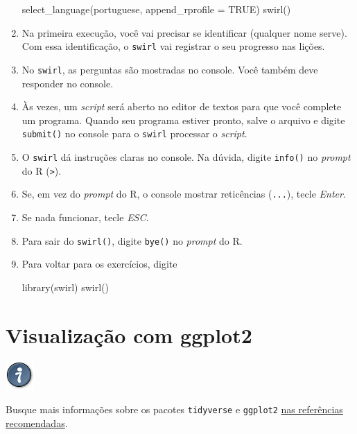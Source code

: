 \documentclass[
  11pt]{report}
\newenvironment{Shaded}{\begin{snugshade}}{\end{snugshade}}
\newcommand{\AttributeTok}[1]{\textcolor[rgb]{0.77,0.63,0.00}{#1}}
\newcommand{\ConstantTok}[1]{\textcolor[rgb]{0.00,0.00,0.00}{#1}}
\newcommand{\FunctionTok}[1]{\textcolor[rgb]{0.00,0.00,0.00}{#1}}
\newcommand{\NormalTok}[1]{#1}
\newcommand{\StringTok}[1]{\textcolor[rgb]{0.31,0.60,0.02}{#1}}
\newenvironment{rmdtip}
{
  \begin{mytip}
    \includegraphics{images/tip.png}
    \tcblower
  }
  {
  \end{mytip}
}
\renewenvironment{Shaded}{
  \begin{mdframed}[%
    roundcorner=2pt,%
    innerleftmargin=5pt,%
    innerrightmargin=5pt,%
    topline=true,%
    leftline=true,%
    rightline=true,%
    bottomline=true,%
    linewidth=0.5pt,%
    linecolor=black!20,%
    backgroundcolor=black!2,%
    skipabove=2ex,%
    skipbelow=2.5ex%
  ]%
}
{
  \end{mdframed}
}
\begin{document}
\begin{enumerate}
\begin{Shaded}
\begin{Highlighting}[]
\FunctionTok{select\_language}\NormalTok{(}\StringTok{\textquotesingle{}portuguese\textquotesingle{}}\NormalTok{, }\AttributeTok{append\_rprofile =} \ConstantTok{TRUE}\NormalTok{)}
\FunctionTok{swirl}\NormalTok{()}
\end{Highlighting}
\end{Shaded}
\item
  Na primeira execução, você vai precisar se identificar (qualquer nome serve). Com essa identificação, o \texttt{swirl} vai registrar o seu progresso nas lições.
\item
  No \texttt{swirl}, as perguntas são mostradas no console. Você também deve responder no console.
\item
  Às vezes, um \emph{script} será aberto no editor de textos para que você complete um programa. Quando seu programa estiver pronto, salve o arquivo e digite \texttt{submit()} no console para o \texttt{swirl} processar o \emph{script}.
\item
  O \texttt{swirl} dá instruções claras no console. Na dúvida, digite \texttt{info()} no \emph{prompt} do R (\texttt{\textgreater{}}).
\item
  Se, em vez do \emph{prompt} do R, o console mostrar reticências (\texttt{...}), tecle \emph{Enter}.
\item
  Se nada funcionar, tecle \emph{ESC}.
\item
  Para sair do \texttt{swirl()}, digite \texttt{bye()} no \emph{prompt} do R.
\item
  Para voltar para os exercícios, digite

\begin{Shaded}
\begin{Highlighting}[]
\FunctionTok{library}\NormalTok{(swirl)}
\FunctionTok{swirl}\NormalTok{()}
\end{Highlighting}
\end{Shaded}
\end{enumerate}

\hypertarget{viz}{%
\chapter{Visualização com ggplot2}\label{viz}}

\begin{rmdtip}
Busque mais informações sobre os pacotes \texttt{tidyverse} e \texttt{ggplot2} \protect\hyperlink{refrec}{nas referências recomendadas}.

\end{rmdtip}
\end{document}
